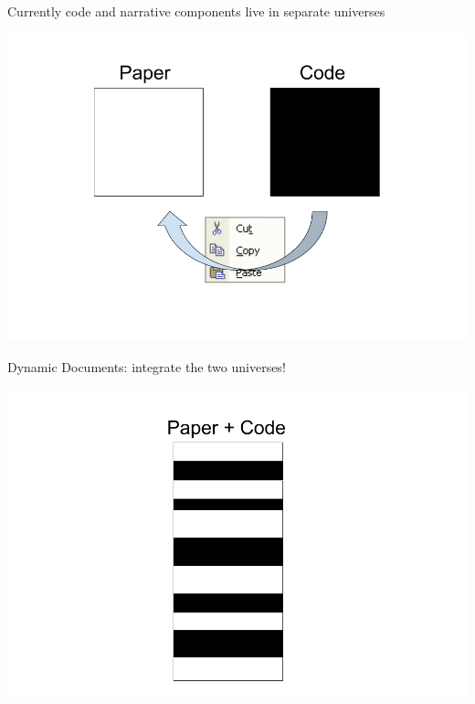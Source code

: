 \documentclass[ignorenonframetext,]{beamer}
\begin{document}
\begin{frame}{Currently code and narrative components live in separate
universes}
\protect\hypertarget{currently-code-and-narrative-components-live-in-separate-universes}{}

\includegraphics{../Images/Two universes.png}

\end{frame}

\begin{frame}{Dynamic Documents: integrate the two universes!}
\protect\hypertarget{dynamic-documents-integrate-the-two-universes}{}

\includegraphics{../Images/One universe.png}

\end{frame}
\end{document}
